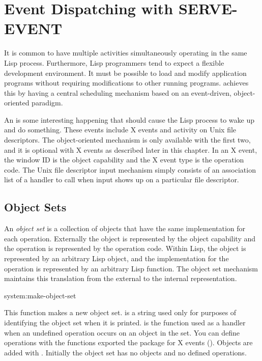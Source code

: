 \chapter{Event Dispatching with SERVE-EVENT}
\label{serve-event}



It is common to have multiple activities simultaneously operating in the same
Lisp process.  Furthermore, Lisp programmers tend to expect a flexible
development environment.  It must be possible to load and modify application
programs without requiring modifications to other running programs.  \cmucl{}
achieves this by having a central scheduling mechanism based on an
event-driven, object-oriented paradigm.

An  is some interesting happening that should cause the Lisp process
to wake up and do something.  These events include X events and activity on
Unix file descriptors.  The object-oriented mechanism is only available with
the first two, and it is optional with X events as described later in this
chapter.  In an X event, the window ID is the object capability and the X event
type is the operation code.  The Unix file descriptor input mechanism simply
consists of an association list of a handler to call when input shows up on a
particular file descriptor.


\section{Object Sets}
\label{object-sets}

An {\em object set} is a collection of objects that have the same implementation
for each operation.  Externally the object is represented by the object
capability and the operation is represented by the operation code.  Within
Lisp, the object is represented by an arbitrary Lisp object, and the
implementation for the operation is represented by an arbitrary Lisp function.
The object set mechanism maintains this translation from the external to the
internal representation.

\begin{defun}{system:}{make-object-set}{%
    }
  
  This function makes a new object set.   is a string used
  only for purposes of identifying the object set when it is printed.
   is the function used as a handler when an
  undefined operation occurs on an object in the set.  You can define
  operations with the  functions exported
  the  package for X events
  ().  Objects are added with
  .  Initially the object set has no
  objects and no defined operations.
\end{defun}

